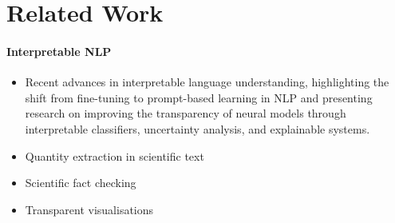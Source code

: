 \section{Related Work}
\label{sec:related}

\paragraph{Interpretable NLP}

\begin{itemize}
    \item Recent advances in interpretable language understanding, highlighting the shift from fine-tuning to prompt-based learning in NLP and presenting research on improving the transparency of neural models through interpretable classifiers, uncertainty analysis, and explainable systems. \cite{Yulan_2023}
    \item Quantity extraction in scientific text \cite{bolucu-etal-2023-investigating}
    \item Scientific fact checking \cite{abu-ahmad-etal-2025-climatecheck-shared}
    \item Transparent visualisations \cite{perera22,bond25,psallidas18smoke}
\end{itemize}
